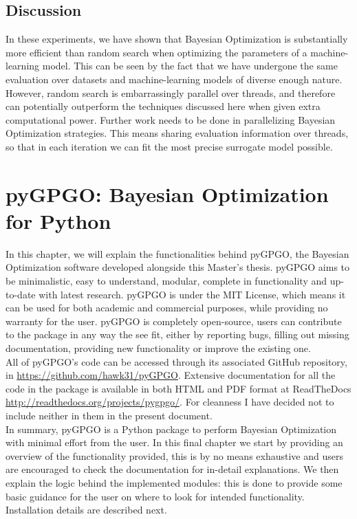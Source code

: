 \documentclass[10pt,a4paper,twoside]{book}
\begin{document}
\section{Discussion}
In these experiments, we have shown that Bayesian Optimization is substantially more efficient than random search when optimizing the parameters of a machine-learning model. This can be seen by the fact that we have undergone the same evaluation over datasets and machine-learning models of diverse enough nature. However, random search is embarrassingly parallel over threads, and therefore can potentially outperform the techniques discussed here when given extra computational power. Further work needs to be done in parallelizing Bayesian Optimization strategies. This means sharing evaluation information over threads, so that in each iteration we can fit the most precise surrogate model possible.

\printbibliography

\chapter{pyGPGO: Bayesian Optimization for Python}

In this chapter, we will explain the functionalities behind pyGPGO, the Bayesian Optimization software developed alongside this Master's thesis. pyGPGO aims to be minimalistic, easy to understand, modular, complete in functionality and up-to-date with latest research. pyGPGO is under the MIT License, which means it can be used for both academic and commercial purposes, while providing no warranty for the user. pyGPGO is completely open-source, users can contribute to the package in any way the see fit, either by reporting bugs, filling out missing documentation, providing new functionality or improve the existing one.\\

All of pyGPGO's code can be accessed through its associated GitHub repository, in \url{https://github.com/hawk31/pyGPGO}. Extensive documentation for all the code in the package is available in both HTML and PDF format at ReadTheDocs \url{http://readthedocs.org/projects/pygpgo/}. For cleanness I have decided not to include neither in them in the present document.\\

In summary, pyGPGO is a Python package to perform Bayesian Optimization with minimal effort from the user.
In this final chapter we start by providing an overview of the functionality provided, this is by no means exhaustive and users are encouraged to check the documentation for in-detail explanations. We then explain the logic behind the implemented modules: this is done to provide some basic guidance for the user on where to look for intended functionality. Installation details are described next. \\
\end{document}
